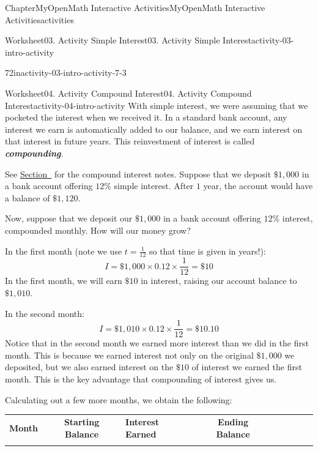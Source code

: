 \documentclass[oneside,10pt,]{book}
\newcommand{\tabularfont}{\relax}
\newcommand{\ptxlistdisc}{\raisebox{0.3ex}{\textbullet}}
\newcommand{\alert}[1]{\textbf{\textit{#1}}}
\newcommand{\hrulethin}  {\noalign{\hrule height 0.04em}}
\begin{document}
\begin{chapterptx}{Chapter}{MyOpenMath Interactive Activities}{}{MyOpenMath Interactive Activities}{}{}{activities}
\begin{worksheet-section}{Worksheet}{03. Activity Simple Interest}{}{03. Activity Simple Interest}{}{}{activity-03-intro-activity}
\begin{divisionexercise}{7}{}{2in}{activity-03-intro-activity-7-3}
\begin{itemize}[label=\ptxlistdisc]
\end{itemize}
%
\end{divisionexercise}%
\end{worksheet-section}
\restoregeometry
%
%
\typeout{************************************************}
\typeout{************************************************}
%
\begin{worksheet-section}{Worksheet}{04. Activity Compound Interest}{}{04. Activity Compound Interest}{}{}{activity-04-intro-activity}
With simple interest, we were assuming that we pocketed the interest when we received it. In a standard bank account, any interest we earn is automatically added to our balance, and we earn interest on that interest in future years. This reinvestment of interest is called \alert{compounding}.%
 \par
See \hyperref[notes-compound-interest]{Section~} for the compound interest notes.%
Suppose that we deposit \(\$1,000\) in a bank account offering \(12\%\) simple interest. After \(1\) year, the account would have a balance of \(\$1,120\).%
\par
Now, suppose that we deposit our \(\$1,000\) in a bank account offering \(12\%\) interest, compounded monthly. How will our money grow?%
\par
In the first month (note we use \(t = \frac{1}{12}\) so that time is given in years!):%
\begin{equation*}
I = \$1,000 \times 0.12 \times \frac{1}{12} = \$10
\end{equation*}
In the first month, we will earn \(\$10\) in interest, raising our account balance to \(\$1,010\).%
\par
In the second month:%
\begin{equation*}
I = \$1,010 \times 0.12 \times \frac{1}{12} = \$10.10
\end{equation*}
Notice that in the second month we earned more interest than we did in the first month. This is because we earned interest not only on the original \(\$1,000\) we deposited, but we also earned interest on the \(\$10\) of interest we earned the first month. This is the key advantage that compounding of interest gives us.%
\par
Calculating out a few more months, we obtain the following:%
\begin{center}%
{\tabularfont%
\begin{tabular}{AcAcAcAcA}\hrulethin
{\bfseries{}Month}&{\bfseries{}Starting Balance}&{\bfseries{}Interest Earned}&{\bfseries{}Ending Balance}\tabularnewline\hrulethin

\end{tabular}}
\end{center}
\end{worksheet-section}
\end{chapterptx}
\end{document}
